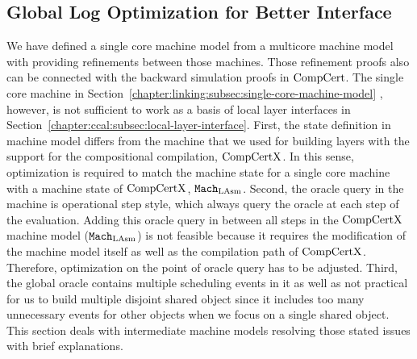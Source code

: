 
\subsection{Global Log Optimization for Better Interface}
\label{chapter:linking:subsec:global-log-optimization}

We have defined a single core machine model from a multicore machine model with providing refinements between those machines. 
Those refinement proofs also can be connected with the backward simulation proofs in $\mathrm{CompCert}$. 
The single core machine in Section~\ref{chapter:linking:subsec:single-core-machine-model} , however, 
is not sufficient to work as a 
basis of local layer interfaces in Section~\ref{chapter:ccal:subsec:local-layer-interface}. 
First, the state definition in machine model differs from the machine that we used for building layers with the support for the compositional compilation, $\mathrm{CompCertX}$. 
In this sense, optimization is required to match the machine state for a single core machine with a machine state of $\mathrm{CompCertX}$, ${\mathrm{\texttt{Mach}}}_{\mathrm{LAsm}}$. 
Second, the oracle query in the machine is operational step style, 
which always query the oracle at each step of the evaluation.
Adding this oracle query in between all steps in the $\mathrm{CompCertX}$ machine model (${\mathrm{\texttt{Mach}}}_{\mathrm{LAsm}}$) is not feasible because it requires the modification of the machine model itself as well as the compilation path of $\mathrm{CompCertX}$. 
Therefore, 
optimization on the point of oracle query has to be adjusted. 
Third, the global oracle contains multiple scheduling events in it as well as not practical for us to build multiple disjoint shared object since it includes too many unnecessary events for other objects when we focus on a single shared object. 
This section deals with intermediate machine models resolving those stated issues with brief explanations. 



